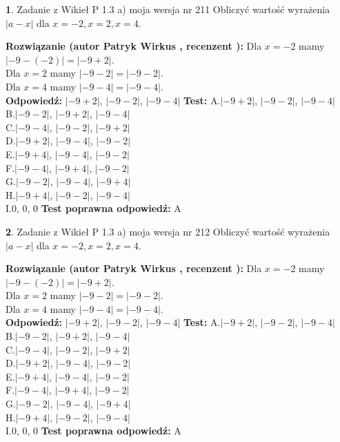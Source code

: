 \documentclass[12pt, a4paper]{article}
\theoremstyle{definition} %
\newtheorem{zad}{}
\newcommand{\zadStart}[1]{\begin{zad}#1\newline}
\newcommand{\zadStop}{\end{zad}}
\newcommand{\rozwStart}[2]{\noindent \textbf{Rozwiązanie (autor #1 , recenzent #2): }\newline}
\newcommand{\rozwStop}{\newline}
\newcommand{\odpStart}{\noindent \textbf{Odpowiedź:}\newline}
\newcommand{\odpStop}{\newline}
\newcommand{\testStart}{\noindent \textbf{Test:}\newline}
\newcommand{\testStop}{\newline}
\newcommand{\kluczStart}{\noindent \textbf{Test poprawna odpowiedź:}\newline}
\newcommand{\kluczStop}{\newline}
\begin{document}
\zadStart{Zadanie z Wikieł P 1.3 a) moja wersja nr 211}
Obliczyć wartość wyrażenia $|a - x|$ dla $x=-2,x=2,x=4$.
\zadStop
\rozwStart{Patryk Wirkus}{}
Dla $x = -2$ mamy $|-9 - (-2)| = |-9 + 2|$.\\
Dla $x = 2$ mamy $|-9 - 2| = |-9 - 2|$.\\
Dla $x = 4$ mamy $|-9 - 4| = |-9 - 4|$.\\
\rozwStop
\odpStart
$|-9 + 2|$, $|-9 - 2|$, $|-9 - 4|$
\odpStop
\testStart
A.$|-9 + 2|$, $|-9 - 2|$, $|-9 - 4|$\\
B.$|-9 - 2|$, $|-9 + 2|$, $|-9 - 4|$\\
C.$|-9 - 4|$, $|-9 - 2|$, $|-9 + 2|$\\
D.$|-9 + 2|$, $|-9 - 4|$, $|-9 - 2|$\\
E.$|-9 + 4|$, $|-9 - 4|$, $|-9 - 2|$\\
F.$|-9 - 4|$, $|-9 + 4|$, $|-9 - 2|$\\
G.$|-9 - 2|$, $|-9 - 4|$, $|-9 + 4|$\\
H.$|-9 + 4|$, $|-9 - 2|$, $|-9 - 4|$\\
I.$0$, $0$, $0$
\testStop
\kluczStart
A
\kluczStop



\zadStart{Zadanie z Wikieł P 1.3 a) moja wersja nr 212}
Obliczyć wartość wyrażenia $|a - x|$ dla $x=-2,x=2,x=4$.
\zadStop
\rozwStart{Patryk Wirkus}{}
Dla $x = -2$ mamy $|-9 - (-2)| = |-9 + 2|$.\\
Dla $x = 2$ mamy $|-9 - 2| = |-9 - 2|$.\\
Dla $x = 4$ mamy $|-9 - 4| = |-9 - 4|$.\\
\rozwStop
\odpStart
$|-9 + 2|$, $|-9 - 2|$, $|-9 - 4|$
\odpStop
\testStart
A.$|-9 + 2|$, $|-9 - 2|$, $|-9 - 4|$\\
B.$|-9 - 2|$, $|-9 + 2|$, $|-9 - 4|$\\
C.$|-9 - 4|$, $|-9 - 2|$, $|-9 + 2|$\\
D.$|-9 + 2|$, $|-9 - 4|$, $|-9 - 2|$\\
E.$|-9 + 4|$, $|-9 - 4|$, $|-9 - 2|$\\
F.$|-9 - 4|$, $|-9 + 4|$, $|-9 - 2|$\\
G.$|-9 - 2|$, $|-9 - 4|$, $|-9 + 4|$\\
H.$|-9 + 4|$, $|-9 - 2|$, $|-9 - 4|$\\
I.$0$, $0$, $0$
\testStop
\kluczStart
A
\kluczStop
\end{document}
